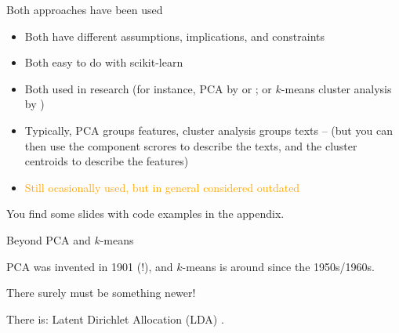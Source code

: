 \begin{frame}{Both approaches have been used}
  \begin{itemize}
  \item Both have different assumptions, implications, and constraints
  \item Both easy to do with scikit-learn
  \item Both used in research (for instance, PCA by   \textcite{Leydesdorff2017} or \textcite{Greussing2017}; or $k$-means cluster analysis by \textcite{burscher2016})
  \item Typically, PCA groups features, cluster analysis groups texts --  (but you can then use the component scrores to describe the texts, and the cluster centroids to describe the features)
  \item \textcolor{orange}{Still ocasionally used, but in general considered outdated}
  \end{itemize}
  
\end{frame}




\begin{frame}[standout]
You find some slides with code examples in the appendix.
\end{frame}












\begin{frame}{Beyond PCA and $k$-means}

  PCA was invented in 1901 (!), and $k$-means is around since the 1950s/1960s.

  There surely must be something newer!

  \pause

  There is: Latent Dirichlet Allocation (LDA) \parencite{Blei2003}.

\end{frame}


